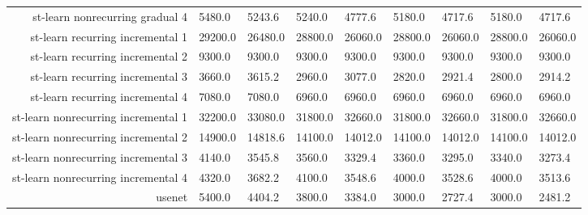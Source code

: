 \begin{tabular}{|r|l|l|l|l|l|l|l|l|}
  st-learn nonrecurring gradual 4 & 5480.0 & 5243.6 & 5240.0 & 4777.6 & 5180.0 & 4717.6 & 5180.0 & 4717.6 \\ 
  st-learn recurring incremental 1 & 29200.0 & 26480.0 & 28800.0 & 26060.0 & 28800.0 & 26060.0 & 28800.0 & 26060.0 \\ 
  st-learn recurring incremental 2 & 9300.0 & 9300.0 & 9300.0 & 9300.0 & 9300.0 & 9300.0 & 9300.0 & 9300.0 \\ 
  st-learn recurring incremental 3 & 3660.0 & 3615.2 & 2960.0 & 3077.0 & 2820.0 & 2921.4 & 2800.0 & 2914.2 \\ 
  st-learn recurring incremental 4 & 7080.0 & 7080.0 & 6960.0 & 6960.0 & 6960.0 & 6960.0 & 6960.0 & 6960.0 \\ 
  st-learn nonrecurring incremental 1 & 32200.0 & 33080.0 & 31800.0 & 32660.0 & 31800.0 & 32660.0 & 31800.0 & 32660.0 \\ 
  st-learn nonrecurring incremental 2 & 14900.0 & 14818.6 & 14100.0 & 14012.0 & 14100.0 & 14012.0 & 14100.0 & 14012.0 \\ 
  st-learn nonrecurring incremental 3 & 4140.0 & 3545.8 & 3560.0 & 3329.4 & 3360.0 & 3295.0 & 3340.0 & 3273.4 \\ 
  st-learn nonrecurring incremental 4 & 4320.0 & 3682.2 & 4100.0 & 3548.6 & 4000.0 & 3528.6 & 4000.0 & 3513.6 \\ 
  usenet & 5400.0 & 4404.2 & 3800.0 & 3384.0 & 3000.0 & 2727.4 & 3000.0 & 2481.2 \\ 
\end{tabular}
